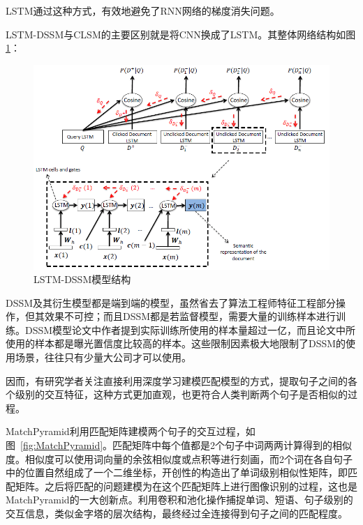 LSTM通过这种方式，有效地避免了RNN网络的梯度消失问题。

LSTM-DSSM与CLSM的主要区别就是将CNN换成了LSTM。其整体网络结构如图\ref{fig:LSTM-DSSM}：

\begin{figure}[!htbp]
\vspace{1em}
\centering
  \includegraphics[width=0.8\linewidth]{figures/LSTM-DSSM.png}
  \caption{LSTM-DSSM模型结构}
  \label{fig:LSTM-DSSM}       %
\vspace{1em}
\end{figure}

DSSM及其衍生模型都是端到端的模型，虽然省去了算法工程师特征工程部分操作，但其效果不可控；而且DSSM都是若监督模型，需要大量的训练样本进行训练。DSSM模型论文中作者提到实际训练所使用的样本量超过一亿，而且论文中所使用的样本都是曝光置信度比较高的样本。这些限制因素极大地限制了DSSM的使用场景，往往只有少量大公司才可以使用。

因而，有研究学者关注直接利用深度学习建模匹配模型的方式，提取句子之间的各个级别的交互特征，这种方式更加直观，也更符合人类判断两个句子是否相似的过程。

MatchPyramid\cite{Pang2016TextMA}利用匹配矩阵建模两个句子的交互过程，如图~\ref{fig:MatchPyramid}。匹配矩阵中每个值都是2个句子中词两两计算得到的相似度。相似度可以使用词向量的余弦相似度或点积等进行刻画，而2个词在各自句子中的位置自然组成了一个二维坐标，开创性的构造出了单词级别相似性矩阵，即匹配矩阵。之后将匹配的问题建模为在这个匹配矩阵上进行图像识别的过程，这也是MatchPyramid的一大创新点。利用卷积和池化操作捕捉单词、短语、句子级别的交互信息，类似金字塔的层次结构，最终经过全连接得到句子之间的匹配程度。

